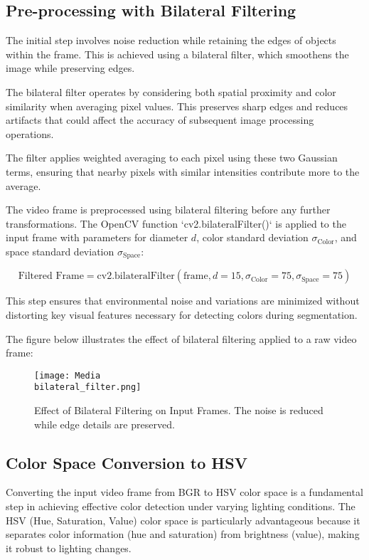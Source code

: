 \documentclass[onecolumn]{article} %
\begin{document}
\subsection{Pre-processing with Bilateral Filtering}

The initial step involves noise reduction while retaining the edges of objects within the frame. This is achieved using a bilateral filter, which smoothens the image while preserving edges.

The bilateral filter operates by considering both spatial proximity and color similarity when averaging pixel values. This preserves sharp edges and reduces artifacts that could affect the accuracy of subsequent image processing operations.

The filter applies weighted averaging to each pixel using these two Gaussian terms, ensuring that nearby pixels with similar intensities contribute more to the average.

The video frame is preprocessed using bilateral filtering before any further transformations. The OpenCV function `cv2.bilateralFilter()` is applied to the input frame with parameters for diameter \( d \), color standard deviation \( \sigma_\text{Color} \), and space standard deviation \( \sigma_\text{Space} \):

\[
\text{Filtered Frame} = \text{cv2.bilateralFilter}(\text{frame}, d=15, \sigma_\text{Color}=75, \sigma_\text{Space}=75)
\]

This step ensures that environmental noise and variations are minimized without distorting key visual features necessary for detecting colors during segmentation.

The figure below illustrates the effect of bilateral filtering applied to a raw video frame:

\begin{figure}[h!]
    \centering
    \texttt{[image: Media\\bilateral\_filter.png]}
    \caption{Effect of Bilateral Filtering on Input Frames. The noise is reduced while edge details are preserved.}
    \label{fig:bilateral_filtering}
\end{figure}

\subsection{Color Space Conversion to HSV}

Converting the input video frame from BGR to HSV color space is a fundamental step in achieving effective color detection under varying lighting conditions. The HSV (Hue, Saturation, Value) color space is particularly advantageous because it separates color information (hue and saturation) from brightness (value), making it robust to lighting changes.
\end{document}
